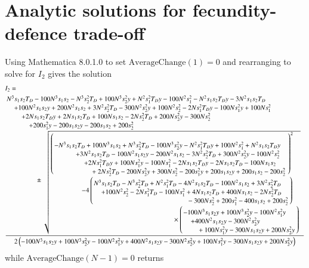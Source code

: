 \documentclass[a4paper]{article}
\begin{document}
   \section{Analytic solutions for fecundity-defence trade-off}
   \label{app:fdtoroots}
    Using Mathematica 8.0.1.0 to set $\text{AverageChange}(1)=0$ and rearranging to solve for $I_2$ gives the solution
 \begin{align}
 &I_2=\\
 &
\frac{ \splitfrac{N^3 s_1 s_2 T_D - 100 N^3 s_1 s_2 - N^3 s_2^2 T_D + 100 N^3 s_2^2 y + N^2 s_1^2
   T_D y - 100 N^2 s_1^2 - N^2 s_1 s_2 T_D y - 3 N^2 s_1 s_2 T_D }{\splitfrac{+100 N^2 s_1 s_2
   y+ 200 N^2 s_1 s_2+ 3 N^2 s_2^2 T_D- 300 N^2 s_2^2 y+ 100 N^2 s_2^2- 2 N
   s_1^2 T_D y- 100 N s_1^2 y+ 100 N s_1^2}{\splitfrac{+2 N s_1 s_2 T_D y+ 2 N s_1 s_2 T_D+ 100
   N s_1 s_2- 2 N s_2^2 T_D+ 200 N s_2^2 y- 300 N s_2^2}{\splitfrac{+ 200 s_1^2 y- 200 s_1
   s_2 y-200 s_1 s_2+200 s_2^2}{\pm \sqrt{ \splitfrac{ \left( \splitfrac{-N^3
   s_1 s_2 T_D + 100 N^3 s_1 s_2+ N^3 s_2^2 T_D- 100 N^3 s_2^2 y- N^2 s_1^2 T_D
   y +100 N^2 s_1^2+ N^2 s_1 s_2 T_D y}{ \splitfrac{ + 3 N^2 s_1 s_2 T_D- 100 N^2 s_1 s_2 y- 200
   N^2 s_1 s_2- 3 N^2 s_2^2 T_D+ 300 N^2 s_2^2 y- 100 N^2 s_2^2}{ \splitfrac{+ 2 N s_1^2 T_D y+ 100 N  s_1^2 y- 100 N s_1^2-2 N s_1 s_2 T_D y-2 N s_1 s_2 T_D-100 N s_1
   s_2}{+2 N s_2^2 T_D-200 N s_2^2 y+300 N s_2^2-200 s_1^2 y+200 s_1 s_2
   y+200 s_1 s_2-200 s_2^2}}} \right)^2}{\splitfrac{-4 \left(\splitfrac{ N^3 s_1 s_2 T_D-N^3
  s_2^2 T_D+N^2 s_1^2 T_D-4 N^2 s_1 s_2 T_D-100 N^2 s_1 s_2+3 N^2
   s_2^2 T_D}{\splitfrac{+100 N^2 s_2^2-2 N s_1^2 T_D-100 N s_1^2+4 N s_1 s_2 T_D+400 N s_1
   s_2-2 N s_2^2 T_D}{-300 N s_2^2+200 s_1^2-400 s_1 s_2+200 s_2^2}}\right)}
   {\times \left(\splitfrac{-100 N^3 s_1 s_2 y+100 N^3 s_2^2 y-100 N^2 s_1^2 y}{\splitfrac{+400 N^2 s_1 s_2
   y-300 N^2 s_2^2 y}{+100 N s_1^2 y-300 N s_1 s_2 y+200 N s_2^2 y}} \right)}}}}}}}}   {2 \left(-100 N^3 s_1 s_2 y+100 N^3 s_2^2
   y-100 N^2 s_1^2 y+400 N^2 s_1 s_2 y-300 N^2 s_2^2 y+100 N s_1^2 y-300 N s_1
   s_2 y+200 N s_2^2 y \right)} \notag
   \end{align}
   while $\text{AverageChange}(N-1)=0$ returns
\end{document}

